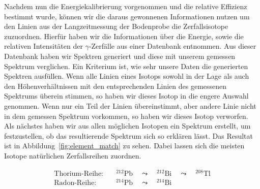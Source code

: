 \documentclass[11pt, ngerman, fleqn, DIV=15, headinclude, BCOR=2cm]{scrreprt}
\begin{document}
Nachdem nun die Energiekalibrierung vorgenommen und die relative
Effizienz bestimmt wurde, können wir die daraus gewonnenen Informationen nutzen
um den Linien aus der Langzeitmessung der Bodenprobe die Zerfallsisotope
zuzuordnen.
Hierfür haben wir die Informationen über die Energie, sowie die relativen
Intensitäten der $\gamma$-Zerfälle aus einer Datenbank
\parencite{IAEA-gamma-ray-database} entnommen.
Aus dieser Datenbank haben wir Spektren generiert und diese mit unserem gemessen
Spektrum verglichen.
Ein Kriterium ist, wie sehr unsere Daten die generierten Spektren
ausfüllen. Wenn alle Linien eines Isotops sowohl in der Lage als auch den
Höhenverhältnissen
mit den entsprechenden Linien des gemessenen Spektrums überein stimmen, so haben
wir dieses Isotop in die engere Auswahl genommen. Wenn nur ein Teil der Linien
übereinstimmt, aber andere Linie nicht in dem gemessen Spektrum vorkommen, so
haben wir dieses Isotop verworfen.
Als nächstes haben wir aus allen möglichen Isotopen ein Spektrum erstellt, um
festzustellen, ob das resultierende Spektrum sich so erklären lässt.
Das Resultat ist in Abbildung~\ref{fig:element_match} zu sehen.
Dabei lassen sich die meisten Isotope natürlichen Zerfallsreihen zuordnen.

\begin{align*}
    \text{Thorium-Reihe:} & \quad ^{212}\text{Pb} \quad \leadsto \quad ^{212}\text{Bi}
     \quad\leadsto \quad ^{208}\text{Tl} \\
    \text{Radon-Reihe:} & \quad ^{214}\text{Pb} \quad \leadsto  \quad ^{214}\text{Bi}
\end{align*}
\end{document}
